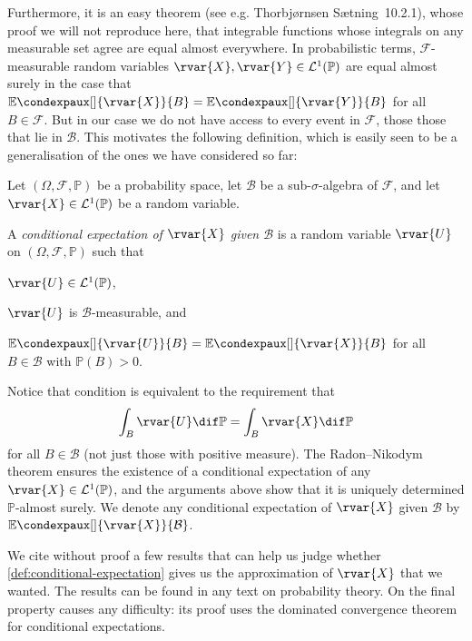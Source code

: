 \documentclass[article, a4paper, 11pt, oneside]{memoir}
\numberwithin{equation}{chapter}
\newcommand{\calB}{\mathcal{B}}
\newcommand{\calF}{\mathcal{F}}
\newcommand{\calL}{\mathcal{L}}
\renewcommand{\P}{\mathbb{P}}
\newcommand{\condexp}[3][]{{\mathbb{E}\condexpaux[#1]{#2}{#3}}}
\begin{document}
Furthermore, it is an easy theorem (see e.g. Thorbjørnsen Sætning~10.2.1), whose proof we will not reproduce here, that integrable functions whose integrals on any measurable set agree are equal almost everywhere. In probabilistic terms, $\calF$-measurable random variables $\rvar{X}, \rvar{Y} \in \calL^1(\P)$ are equal almost surely in the case that $\condexp{\rvar{X}}{B} = \condexp{\rvar{Y}}{B}$ for all $B \in \calF$. But in our case we do not have access to every event in $\calF$, those those that lie in $\calB$. This motivates the following definition, which is easily seen to be a generalisation of the ones we have considered so far:

\begin{definition}
    \label{def:conditional-expectation}
    Let $(\Omega, \calF, \P)$ be a probability space, let $\calB$ be a sub-$\sigma$-algebra of $\calF$, and let $\rvar{X} \in \calL^1(\P)$ be a random variable.

    A \emph{conditional expectation of $\rvar{X}$ given $\calB$} is a random variable $\rvar{U}$ on $(\Omega, \calF, \P)$ such that
    \begin{enumdef}
        \item $\rvar{U} \in \calL^1(\P)$,
        \item $\rvar{U}$ is $\calB$-measurable, and
        \item \label{enum:conditional-expectation-local-approx} $\condexp{\rvar{U}}{B} = \condexp{\rvar{X}}{B}$ for all $B \in \calB$ with $\P(B) > 0$.
    \end{enumdef}
\end{definition}
%
Notice that condition  is equivalent to the requirement that
%
\begin{equation*}
    \int_B \rvar{U} \dif\P
        = \int_B \rvar{X} \dif\P
\end{equation*}
%
for all $B \in \calB$ (not just those with positive measure). The Radon--Nikodym theorem ensures the existence of a conditional expectation of any $\rvar{X} \in \calL^1(\P)$, and the arguments above show that it is uniquely determined $\P$-almost surely. We denote any conditional expectation of $\rvar{X}$ given $\calB$ by $\condexp{\rvar{X}}{\calB}$.

We cite without proof a few results that can help us judge whether \cref{def:conditional-expectation} gives us the approximation of $\rvar{X}$ that we wanted. The results can be found in any text on probability theory. On the final property causes any difficulty: its proof uses the dominated convergence theorem for conditional expectations.
\end{document}
